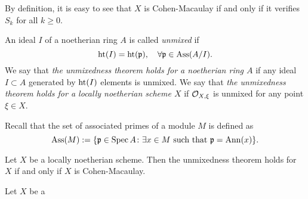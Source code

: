     By definition, it is easy to see that $X$ is Cohen-Macaulay if and only if it verifies $S_k$ for all $k \geq 0$.

    \begin{example}

    \end{example}

    \begin{definition}
        An ideal $I$ of a noetherian ring $A$ is called \textit{unmixed} if 
        \[ \operatorname{ht}(I) = \operatorname{ht}(\mathfrak{p}), \quad \forall \mathfrak{p} \in \operatorname{Ass}(A/I). \]
        We say that \textit{the unmixedness theorem holds for a noetherian ring $A$} if any ideal $I \subset A$ generated by $\operatorname{ht}(I)$ elements is unmixed.
        We say that \textit{the unmixedness theorem holds for a locally noetherian scheme $X$} if $\mathcal{O}_{X,\xi}$ is unmixed for any point $\xi \in X$.
    \end{definition}

    \begin{remark}
        Recall that the set of associated primes of a module $M$ is defined as
        \[ \operatorname{Ass}(M) := \{ \mathfrak{p} \in \operatorname{Spec} A \colon \exists x \in M \text{ such that } \mathfrak{p} = \operatorname{Ann}(x) \}. \] 
        
    \end{remark}

    \begin{theorem}
        Let $X$ be a locally noetherian scheme.
        Then the unmixedness theorem holds for $X$ if and only if $X$ is Cohen-Macaulay.
    \end{theorem}

    \begin{proposition}
        
    \end{proposition}


    \begin{theorem}
        Let $X$ be a 
    \end{theorem}
    